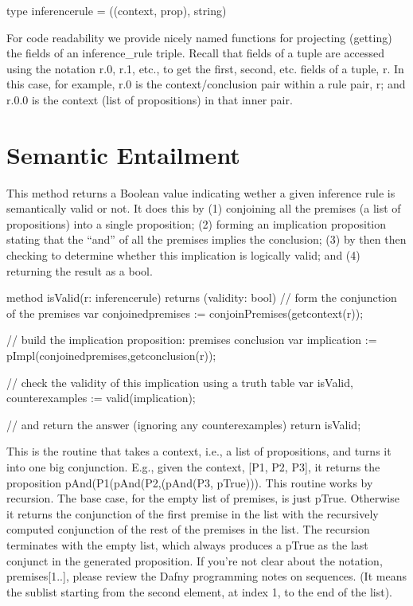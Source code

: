 \documentclass[letterpaper,10pt,english]{sphinxmanual}
\begin{document}
\begin{sphinxVerbatim}[commandchars=\\\{\}]
type inference\PYGZus{}rule = ((context, prop), string)
\end{sphinxVerbatim}

For code readability we provide nicely named functions for projecting
(getting) the fields of an inference\_rule triple. Recall that fields
of a tuple are accessed using the notation r.0, r.1, etc., to get the
first, second, etc. fields of a tuple, r. In this case, for example,
r.0 is the context/conclusion pair within a rule pair, r; and r.0.0 is
the context (list of propositions) in that inner pair.


\section{Semantic Entailment}
\label{\detokenize{13-consequence:semantic-entailment}}
This method returns a Boolean value indicating wether a given
inference rule is semantically valid or not.  It does this by (1)
conjoining all the premises (a list of propositions) into a single
proposition; (2) forming an implication proposition stating that the
“and” of all the premises implies the conclusion; (3) by then then
checking to determine whether this implication is logically valid;
and (4) returning the result as a bool.

\begin{sphinxVerbatim}[commandchars=\\\{\}]
method isValid(r: inference\PYGZus{}rule) returns (validity: bool)
\PYGZob{}
    // form the conjunction of the premises
    var conjoined\PYGZus{}premises := conjoinPremises(get\PYGZus{}context(r));

    // build the implication proposition: premises \PYGZhy{}\PYGZgt{} conclusion
    var implication := pImpl(conjoined\PYGZus{}premises,get\PYGZus{}conclusion(r));

    // check the validity of this implication using a truth table
    var isValid, counter\PYGZus{}examples := valid(implication);

    // and return the answer (ignoring any counter\PYGZhy{}examples)
    return isValid;
\PYGZcb{}
\end{sphinxVerbatim}

This is the routine that takes a context, i.e., a list of
propositions, and turns it into one big conjunction. E.g., given the
context, {[}P1, P2, P3{]}, it returns the proposition
pAnd(P1(pAnd(P2,(pAnd(P3, pTrue))). This routine works by
recursion. The base case, for the empty list of premises, is just
pTrue. Otherwise it returns the conjunction of the first premise in
the list with the recursively computed conjunction of the rest of the
premises in the list. The recursion terminates with the empty list,
which always produces a pTrue as the last conjunct in the generated
proposition. If you’re not clear about the notation, premises{[}1..{]},
please review the Dafny programming notes on sequences. (It means the
sublist starting from the second element, at index 1, to the end of
the list).
\end{document}
